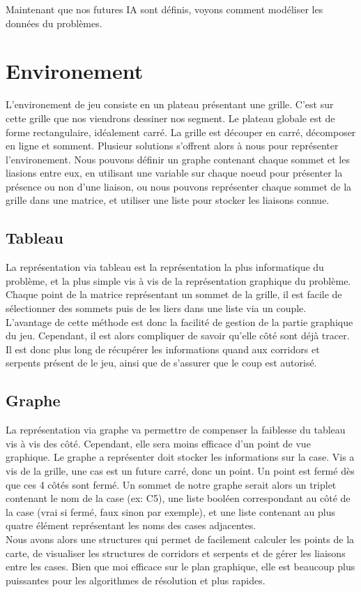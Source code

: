 \documentclass[a4paper,12pt]{report}
\begin{document}
Maintenant que nos futures IA sont d\'efinis, voyons comment mod\'eliser les donn\'ees du probl\`emes.

\chapter{Environement}

L'environement de jeu consiste en un plateau pr\'esentant une grille. C'est sur cette grille que nos viendrons dessiner nos segment. Le plateau globale est de forme rectangulaire, id\'ealement carr\'e. La grille est d\'ecouper en carr\'e, d\'ecomposer en ligne et somment. Plusieur solutions s'offrent alors \`a nous pour repr\'esenter l'environement. Nous pouvons d\'efinir un graphe contenant chaque sommet et les liasions entre eux, en utilisant une variable sur chaque noeud pour pr\'esenter la pr\'esence ou non d'une liaison, ou nous pouvons repr\'esenter chaque sommet de la grille dans une matrice, et utiliser une liste pour stocker les liaisons connue. \\

\section{Tableau}

La repr\'esentation via tableau est la repr\'esentation la plus informatique du probl\`eme, et la plus simple vis \`a vis de la repr\'esentation graphique du probl\`eme. Chaque point de la matrice repr\'esentant un sommet de la grille, il est facile de s\'electionner des sommets puis de les liers dans une liste via un couple.\\
L'avantage de cette m\'ethode est donc la facilit\'e de gestion de la partie graphique du jeu. Cependant, il est alors compliquer de savoir qu'elle c\^ot\'e sont d\'ej\`a tracer. Il est donc plus long de r\'ecup\'erer les informations quand aux corridors et serpents pr\'esent de le jeu, ainsi que de s'assurer que le coup est autoris\'e.

\section{Graphe}

La repr\'esentation via graphe va permettre de compenser la faiblesse du tableau vis \`a vis des c\^ot\'e. Cependant, elle sera moins efficace d'un point de vue graphique. Le graphe a repr\'esenter doit stocker les informations sur la case. Vis a vis de la grille, une cas est un future carr\'e, donc un point. Un point est ferm\'e d\`es que ces 4 c\^ot\'es sont ferm\'e. Un sommet de notre graphe serait alors un triplet contenant le nom de la case (ex: C5), une liste bool\'een correspondant au c\^ot\'e de la case (vrai si ferm\'e, faux sinon par exemple), et une liste contenant au plus quatre \'el\'ement repr\'esentant les noms des cases adjacentes. \\
Nous avons alors une structures qui permet de facilement calculer les points de la carte, de visualiser les structures de corridors et serpents et de g\'erer les liaisons entre les cases. Bien que moi efficace sur le plan graphique, elle est beaucoup plus puissantes pour les algorithmes de r\'esolution et plus rapides. 
\end{document}
